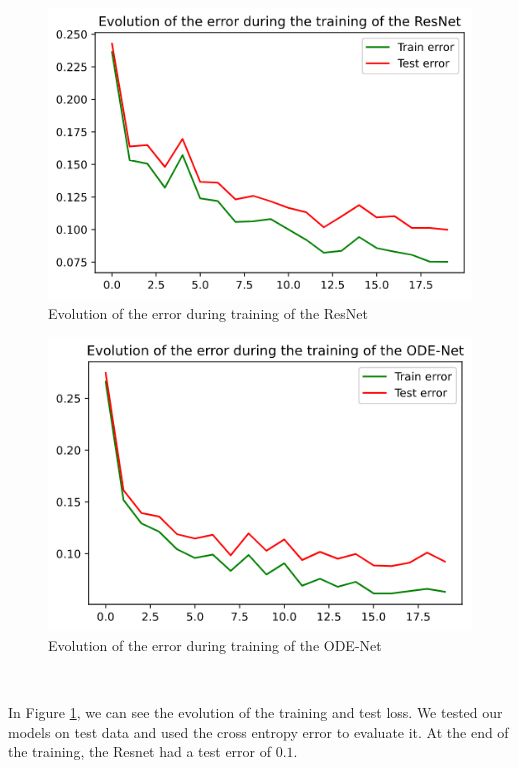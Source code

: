 \documentclass[10pt,a4paper]{article}
\theoremstyle{definition}
\theoremstyle{definition}
\theoremstyle{definition}
\begin{document}
\begin{figure}[!h]
\center
\includegraphics[scale=0.5]{resnet_rd_loss.png}
\caption{Evolution of the error during training of the ResNet}
\label{resnet_rd}
\end{figure}

\begin{figure}[!h]
\center
\includegraphics[scale=0.5]{odenet_rd_loss.png}
\caption{Evolution of the error during training of the ODE-Net}
\label{odenet_rd}
\end{figure}

~

In Figure \ref{resnet_rd}, we can see the evolution of the training and test loss. We tested our models on test data and used the cross entropy error to evaluate it. At the end of the training, the Resnet had a test error of $0.1$.
\end{document}
